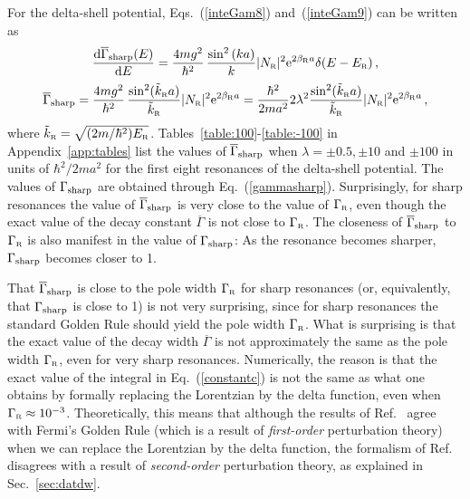 \documentclass[12pt]{article}
\newcommand{\rme}{{\rm e}}
\newcommand{\rmd}{{\rm d}}
\newcommand{\gr}{\Gamma _{\text{\tiny R}}}
\newcommand{\er}{E_{\text{\tiny R}}}
\newcommand{\nr}{N_{\text{\tiny R}}}
\newcommand{\br}{\beta_{\text{\tiny R}}}
\begin{document}
For the delta-shell potential, Eqs.~(\ref{inteGam8}) and~(\ref{inteGam9})
can be written as
\begin{equation}
    \frac{\rmd \overline{\Gamma}_{\rm sharp} (E)}{\rmd E} =
         \frac{4mg^2}{\hbar ^2} \,
      \frac{\sin ^2\left(k a \right)}{k} |\nr|^2 \rme^{2\br a}   \delta (E-\er) 
                \, , 
         \label{inteGam10}
\end{equation}
\begin{equation}
    \overline{\Gamma}_{\rm sharp}   = 
\frac{4mg^2}{\hbar ^2} \,
      \frac{\sin ^2 (\tilde{k}_{\text{\tiny R}} a )}{\tilde{k}_{\text{\tiny R}}} 
        |\nr|^2 \rme^{2\br a} 
       =  \frac{\hbar ^2}{2ma^2} 2 \lambda ^2
      \frac{\sin ^2 (\tilde{k}_{\text{\tiny R}} a )}{\tilde{k}_{\text{\tiny R}}} 
        |\nr|^2 \rme^{2\br a} \, ,
         \label{inteGam11b} 
\end{equation}
where $\tilde{k}_{\text{\tiny R}}=\sqrt{(2m/\hbar ^2)\er}$. 
Tables~\ref{table:100}-\ref{table:-100} in Appendix~\ref{app:tables} list 
the values of 
$\overline{\Gamma}_{\rm sharp}$ when $\lambda = \pm 0.5, \pm 10$ 
and $\pm 100$ in units of $\hbar ^2 /2m a^2$ for the first eight 
resonances of the delta-shell potential. The values of $\Gamma _{\rm sharp}$ 
are obtained through Eq.~(\ref{gammasharp}). Surprisingly, for sharp 
resonances the value of 
$\overline{\Gamma}_{\rm sharp}$ is very close to the value of 
$\gr$, even though the exact value of the
decay constant $\overline{\Gamma}$ is not
close to $\gr$. The closeness of 
$\overline{\Gamma}_{\rm sharp}$ to $\gr$ is also manifest
in the value of $\Gamma _{\rm sharp}$: As the resonance becomes sharper, 
$\Gamma _{\rm sharp}$ becomes closer to 1.

That $\overline{\Gamma}_{\rm sharp}$ is close to the pole width $\gr$ 
for sharp resonances (or,
equivalently, that $\Gamma _{\rm sharp}$ is close to 1)
is not very surprising, since for sharp resonances the standard Golden Rule 
should yield the pole width $\gr$. What is surprising is that the exact value
of the decay width $\overline{\Gamma}$ is not approximately the same as
the pole width $\gr$, even for very sharp resonances. Numerically, the reason 
is that the exact value of the integral in Eq.~(\ref{constantc}) is not the 
same as what one obtains by formally replacing the Lorentzian by the 
delta function, even when $\gr \approx 10^{-3}$. Theoretically, this
means that although the results of Ref.~\cite{NPA15} agree with Fermi's 
Golden Rule (which is a result of {\it first-order} perturbation theory)
when we can replace the Lorentzian by the delta function, the formalism 
of Ref.~\cite{NPA15}
disagrees with a result of {\it second-order}
perturbation theory, as explained in Sec.~\ref{sec:datdw}.
\end{document}
